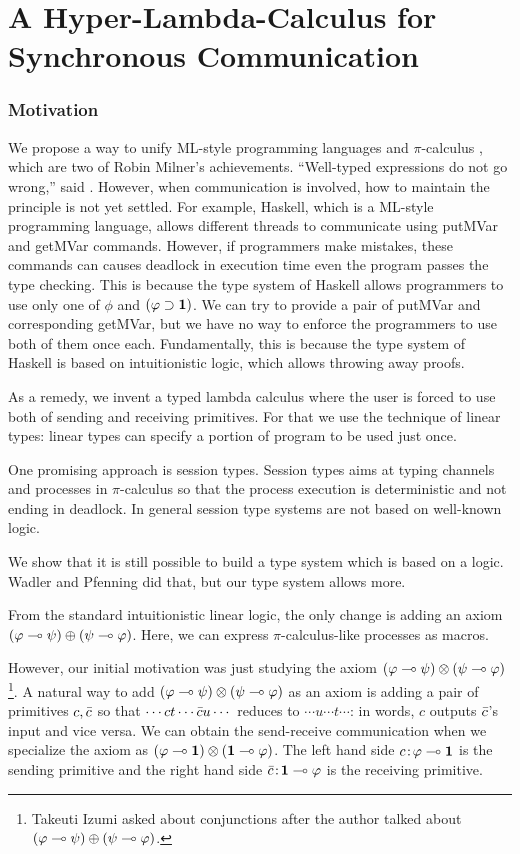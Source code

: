 \chapter{A Hyper-Lambda-Calculus for Synchronous Communication}
\label{ch:exchange}

\subsection{Motivation}

We propose a way to unify ML-style programming languages  and
$\pi$-calculus , which are two of Robin Milner's achievements.
``Well-typed expressions do not go wrong,'' said \citet{milner1978}.
However, when communication is involved, how to maintain the principle
is not yet settled.
For example, Haskell, which is a ML-style programming language,
allows different threads to communicate using
putMVar and getMVar commands.
However, if programmers make mistakes, these commands can
causes deadlock in execution time even the program passes the type checking.
This is because the type system of Haskell allows programmers to
use only one of $\phi$ and $(\varphi\supset \mathbf{1})$.
We can try to provide a pair of putMVar and corresponding getMVar,
but we have no way to enforce the programmers to use both of them once
each.
Fundamentally, this is because the type system of Haskell
is based on intuitionistic logic, which allows throwing away proofs.


As a remedy, we invent a typed lambda calculus where
the user is forced to use both of sending and receiving primitives.
For that we use the technique of linear types:
linear types can specify a portion of program to be used
just once.

One promising approach is session types.
Session types aims at typing channels and processes in $\pi$-calculus so
that the process execution is deterministic and not ending in deadlock.
In general session type systems are not based on well-known logic.

We show that it is still possible to build
a type system which is based on a logic.
Wadler and Pfenning did that, but our type system allows more.

From the standard intuitionistic linear logic,
the only change is adding an axiom
$(\varphi\multimap\psi)\oplus(\psi\multimap\varphi)$.
Here, we can express $\pi$-calculus-like processes as macros.

However, our initial motivation was just studying the axiom
$(\varphi\multimap\psi)\otimes(\psi\multimap\varphi)$%
\footnote{Takeuti Izumi asked about conjunctions
after the author talked about $(\varphi\multimap\psi)\oplus (\psi\multimap\varphi)$.}.
A natural way to add $(\varphi\multimap\psi)\otimes(\psi\multimap\varphi)$ as an axiom
is adding a pair of primitives $c,\bar{c}$ so that
$\cdots ct \cdots \bar{c} u \cdots$ reduces to
$\cdots u  \cdots t \cdots$: in words,
$c$ outputs $\bar{c}$'s input and vice versa.
We can obtain the send-receive communication when we specialize the
axiom as $(\varphi\multimap \mathbf{1})\otimes(\mathbf{1}\multimap\varphi)$.  The left hand side
${c} \mathord{\colon\kern -2pt}{\varphi\multimap\mathbf{1}}$ is the sending primitive and
the right hand side ${\bar{c}} \mathord{\colon\kern -2pt}{\mathbf{1} \multimap\varphi}$ is the receiving
primitive.

